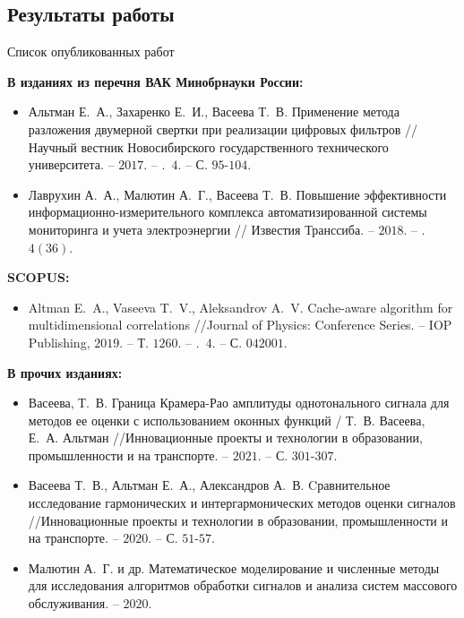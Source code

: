 \subsection{Результаты работы}
\begin{frame}{Список опубликованных работ}
\scriptsize{
\textbf{В изданиях из перечня ВАК Минобрнауки России:}	
\begin{itemize}
	\item Альтман Е.~А., Захаренко Е.~И., Васеева Т.~В. Применение метода разложения двумерной свертки при реализации цифровых фильтров // Научный вестник Новосибирского государственного технического университета. – $2017$. – \textnumero.~$4$. – С. $95$-$104$.
	
	\item Лаврухин А.~А., Малютин А.~Г., Васеева Т.~В. Повышение эффективности информационно-измерительного комплекса автоматизированной системы мониторинга и учета электроэнергии // Известия Транссиба. – $2018$. – \textnumero.~$4 (36)$.
\end{itemize}}	
\scriptsize{
\textbf{SCOPUS:}	
\begin{itemize}
	\item Altman E.~A., Vaseeva T.~V., Aleksandrov A.~V. Cache-aware algorithm for multidimensional correlations //Journal of Physics: Conference Series. – IOP Publishing, $2019$. – Т. $1260$. – \textnumero.~$4$. – С. $042001$.
\end{itemize}}

\scriptsize{
\textbf{В прочих изданиях:}
\begin{itemize}
	\item Васеева, Т.~В. Граница Крамера-Рао амплитуды однотонального сигнала для методов ее оценки с использованием оконных функций / Т.~В. Васеева, Е.~А. Альтман //Инновационные проекты и технологии в образовании, промышленности и на транспорте. – $2021$. – С. $301$-$307$.
	
	\item Васеева Т.~В., Альтман Е.~А., Александров А.~В. Cравнительное исследование гармонических и интергармонических методов оценки сигналов //Инновационные проекты и технологии в образовании, промышленности и на транспорте. – $2020$. – С. $51$-$57$.
		
	\item Малютин А.~Г. и др. Математическое моделирование и численные методы для исследования алгоритмов обработки сигналов и анализа систем массового обслуживания. – $2020$.
\end{itemize}}
\end{frame}	

